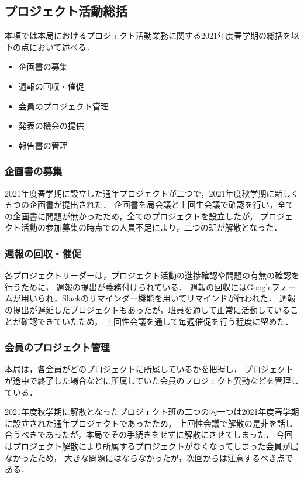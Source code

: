 \subsection*{プロジェクト活動総括}



本項では本局におけるプロジェクト活動業務に関する2021年度春学期の総括を以下の点において述べる．

\begin{itemize}
  \item 企画書の募集
  \item 週報の回収・催促
  \item 会員のプロジェクト管理
  \item 発表の機会の提供
  \item 報告書の管理
\end{itemize}

\subsubsection*{企画書の募集}

2021年度春学期に設立した通年プロジェクトが二つで，2021年度秋学期に新しく五つの企画書が提出された．
企画書を局会議と上回生会議で確認を行い，全ての企画書に問題が無かったため，全てのプロジェクトを設立したが，
プロジェクト活動の参加募集の時点での人員不足により，二つの班が解散となった．

\subsubsection*{週報の回収・催促}

各プロジェクトリーダーは，プロジェクト活動の進捗確認や問題の有無の確認を行うために，
週報の提出が義務付けられている．
週報の回収にはGoogleフォームが用いられ，Slackのリマインダー機能を用いてリマインドが行われた．
週報の提出が遅延したプロジェクトもあったが，班員を通して正常に活動していることが確認できていたため，
上回性会議を通して毎週催促を行う程度に留めた．

\subsubsection*{会員のプロジェクト管理}

本局は，各会員がどのプロジェクトに所属しているかを把握し，
プロジェクトが途中で終了した場合などに所属していた会員のプロジェクト異動などを管理している．

2021年度秋学期に解散となったプロジェクト班の二つの内一つは2021年度春学期に設立された通年プロジェクトであったため，
上回性会議で解散の是非を話し合うべきであったが，本局でその手続きをせずに解散にさせてしまった．
今回はプロジェクト解散により所属するプロジェクトがなくなってしまった会員が居なかったため，
大きな問題にはならなかったが，次回からは注意するべき点である．


